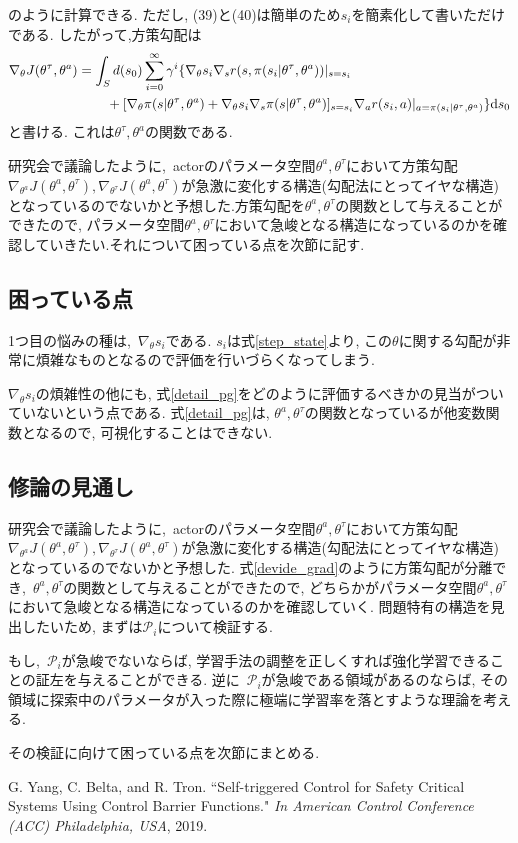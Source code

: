 \documentclass{jsarticle}
\begin{document}
のように計算できる. ただし, (39)と(40)は簡単のため$s_i$を簡素化して書いただけである. したがって,方策勾配は
\begin{align}
	\nabla_{\theta}J(\theta^{\tau}, \theta^a) &= \int_{S}d(s_0)\sum_{i=0}^{\infty}\gamma^{i}\{\nabla_{\theta}s_i\nabla_{s}r(s, \pi(s_i|\theta^{\tau}, \theta^a))|_{s=s_i}\nonumber\\
	&\hspace{5ex}+[\nabla_{\theta}\pi(s|\theta^{\tau}, \theta^a)+\nabla_{\theta}s_i\nabla_{s}\pi(s|\theta^{\tau}, \theta^a)]_{s=s_i}\nabla_{a}r(s_i, a)|_{a=\pi(s_i|\theta^{\tau}, \theta^a)}\}\mathrm{d}s_0\label{detail_pg}
\end{align}
と書ける. これは$\theta^{\tau}, \theta^a$の関数である. \par
研究会で議論したように,~actorのパラメータ空間$\theta^a, \theta^{\tau}$において方策勾配$\nabla_{\theta^a}J(\theta^a, \theta^{\tau}), \nabla_{\theta^{\tau}}J(\theta^a, \theta^{\tau})$が急激に変化する構造(勾配法にとってイヤな構造)となっているのでないかと予想した.方策勾配を$\theta^a, \theta^{\tau}$の関数として与えることができたので, パラメータ空間$\theta^a, \theta^{\tau}$において急峻となる構造になっているのかを確認していきたい.それについて困っている点を次節に記す.

\subsection{困っている点}
1つ目の悩みの種は,~$\nabla_{\theta}s_i$である. $s_i$は式\eqref{step_state}より, この$\theta$に関する勾配が非常に煩雑なものとなるので評価を行いづらくなってしまう. \par
$\nabla_{\theta}s_i$の煩雑性の他にも, 式\eqref{detail_pg}をどのように評価するべきかの見当がついていないという点である. 式\eqref{detail_pg}は, $\theta^a, \theta^{\tau}$の関数となっているが他変数関数となるので, 可視化することはできない.

\subsection{修論の見通し}
研究会で議論したように,~actorのパラメータ空間$\theta^a, \theta^{\tau}$において方策勾配$\nabla_{\theta^a}J(\theta^a, \theta^{\tau}), \nabla_{\theta^{\tau}}J(\theta^a, \theta^{\tau})$が急激に変化する構造(勾配法にとってイヤな構造)となっているのでないかと予想した. 式\eqref{devide_grad}のように方策勾配が分離でき,~$\theta^a, \theta^{\tau}$の関数として与えることができたので, どちらかがパラメータ空間$\theta^a, \theta^{\tau}$において急峻となる構造になっているのかを確認していく. 問題特有の構造を見出したいため, まずは$\mathcal{P}_i$について検証する. \par
もし,~$\mathcal{P}_i$が急峻でないならば, 学習手法の調整を正しくすれば強化学習できることの証左を与えることができる. 逆に~$\mathcal{P}_i$が急峻である領域があるのならば, その領域に探索中のパラメータが入った際に極端に学習率を落とすような理論を考える. \par
その検証に向けて困っている点を次節にまとめる.
\fi

\begin{thebibliography}{10}
G. Yang, C. Belta, and R. Tron. “Self-triggered Control for Safety Critical Systems Using Control Barrier Functions."  \textit{In American Control Conference (ACC) Philadelphia, USA}, 2019.
 
 \end{thebibliography}
\end{document}
